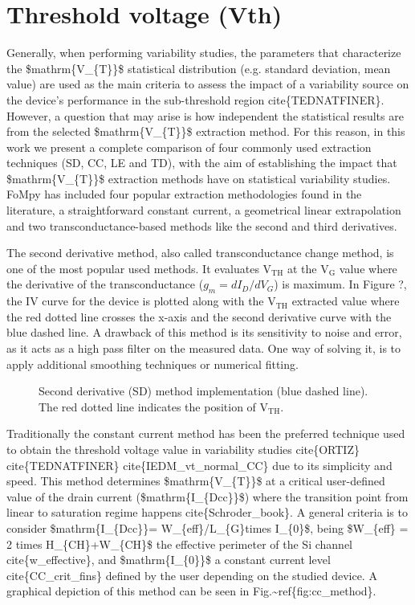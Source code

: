 \documentclass[letterpaper,10pt,english,openany, oneside]{sphinxmanual}
\let\sphinxpxdimen\pdfpxdimen\else\newdimen\sphinxpxdimen
\begin{document}
\section{Threshold voltage (Vth)}
\label{\detokenize{index:threshold-voltage-vth}}
Generally, when performing variability studies, the parameters that characterize the \$mathrm\{V\_\{T\}\}\$ statistical distribution (e.g. standard deviation, mean value) are used as the main criteria to assess the impact of a variability source on the device’s performance in the sub-threshold region cite\{TEDNATFINER\}. However, a question that may arise is how independent the statistical results are from the selected \$mathrm\{V\_\{T\}\}\$ extraction method. For this reason, in this work we present a complete comparison of four commonly used extraction techniques (SD, CC, LE and TD), with the aim of establishing the impact that \$mathrm\{V\_\{T\}\}\$ extraction methods have on statistical variability studies. FoMpy has included four popular extraction methodologies found in the literature, a straightforward constant current, a geometrical linear extrapolation and two transconductance-based methods like the second and third derivatives.

The second derivative method, also called transconductance change method, is one of the most popular used methods. It evaluates \(\mathrm{V_{TH}}\)  at the \(\mathrm{V_{G}}\)  value where the derivative of the transconductance (\(g_{m}=dI_{D}/dV_{G}\)) is maximum. In Figure ?, the IV curve for the device is plotted along with the \(\mathrm{V_{TH}}\) extracted value where the red dotted line crosses the x-axis and the second derivative curve with the blue dashed line. A drawback of this method is its sensitivity to noise and error, as it acts as a high pass filter on the measured data. One way of solving it, is to apply additional smoothing techniques or numerical fitting.

\begin{figure}[htbp]
\centering
\capstart

\noindent\sphinxincludegraphics[width=400\sphinxpxdimen,height=300\sphinxpxdimen]{{second_derivative}.jpg}
\caption{Second derivative (SD) method implementation (blue dashed line). The red dotted line indicates the position of \(\mathrm{V_{TH}}\).}\label{\detokenize{index:id2}}\end{figure}

Traditionally the constant current method has been the preferred technique used to obtain the threshold voltage value in variability studies  cite\{ORTIZ\} cite\{TEDNATFINER\} cite\{IEDM\_vt\_normal\_CC\} due to its simplicity and speed. This method determines \$mathrm\{V\_\{T\}\}\$ at a critical user-defined value of the drain current  (\$mathrm\{I\_\{Dcc\}\}\$)  where the transition point from linear to saturation regime happens cite\{Schroder\_book\}. A general criteria is to consider  \$mathrm\{I\_\{Dcc\}\}= W\_\{eff\}/L\_\{G\}times I\_\{0\}\$, being \$W\_\{eff\} = 2 times H\_\{CH\}+W\_\{CH\}\$ the effective perimeter of the Si channel cite\{w\_effective\}, and \$mathrm\{I\_\{0\}\}\$ a constant current level cite\{CC\_crit\_fins\} defined by the user depending on the studied device. A graphical depiction of this method can be seen in Fig.\textasciitilde{}ref\{fig:cc\_method\}.
\end{document}
